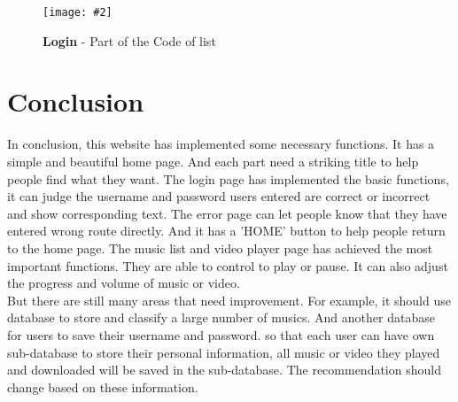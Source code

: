 \documentclass[10pt, a4paper]{article}
\newcommand{\figuremacro}[5]{
    \begin{figure}[#1]
        \centering
        \texttt{[image: \#2]}
        \caption[#3]{\textbf{#3}#4}
        \label{fig:#2}
    \end{figure}
}
\begin{document}
    \figuremacro{h}{3.JPG}{Login}{ - Part of the Code of list }{1.0}


	
\section{Conclusion}
   In conclusion, this website has implemented some necessary functions. It has a simple and beautiful home page. And each part need a striking title to help people find what they want. The login page has implemented the basic functions, it can judge the username and password users entered are correct or incorrect and show corresponding text. The error page can let people know that they have entered wrong route directly. And it has a 'HOME' button to help people return to the home page. The music list and video player page has achieved the most important functions. They are able to control to play or pause. It can also adjust the progress and volume of music or video. \\ But there are still many areas that need improvement. For example, it should use database to store and classify a large number of musics. And another database for users to save their username and password. so that each user can have own sub-database to store their personal information, all music or video they played and downloaded will be saved in the sub-database. The recommendation should change based on these information.
   


		
\end{document}

